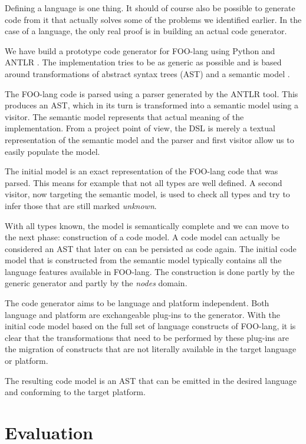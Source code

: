 \documentclass[conference]{IEEEtran}
\begin{document}
Defining a language is one thing. It should of course also be possible to
generate code from it that actually solves some of the problems we identified
earlier. In the case of a language, the only real proof is in building an
actual code generator.

We have build a prototype code generator for FOO-lang using Python and ANTLR
\cite{antlr3}. The implementation tries to be as generic as possible and is
based around transformations of abstract syntax trees (AST) and a semantic
model \cite{fowler2010domain}.

The FOO-lang code is parsed using a parser generated by the ANTLR tool. This
produces an AST, which in its turn is transformed into a semantic model using a
visitor. The semantic model represents that actual meaning of the
implementation. From a project point of view, the DSL is merely a textual
representation of the semantic model and the parser and first visitor allow us
to easily populate the model.

The initial model is an exact representation of the FOO-lang code that was
parsed. This means for example that not all types are well defined. A second
visitor, now targeting the semantic model, is used to check all types and try
to infer those that are still marked \emph{unknown}.

With all types known, the model is semantically complete and we can move to the
next phase: construction of a code model. A code model can actually be
considered an AST that later on can be persisted as code again. The initial
code model that is constructed from the semantic model typically contains all
the language features available in FOO-lang. The construction is done partly by
the generic generator and partly by the \emph{nodes} domain.

The code generator aims to be language and platform independent. Both language
and platform are exchangeable plug-ins to the generator. With the initial code
model based on the full set of language constructs of FOO-lang, it is clear
that the transformations that need to be performed by these plug-ins are the
migration of constructs that are not literally available in the target language
or platform.

The resulting code model is an AST that can be emitted in the desired language
and conforming to the target platform.

\section{Evaluation}
\label{section:evaluation}
\end{document}
